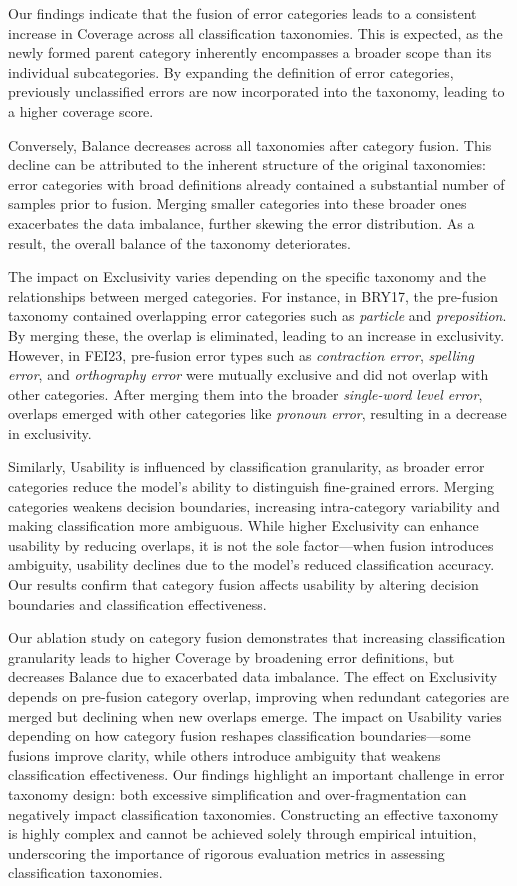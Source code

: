 
Our findings indicate that the fusion of error categories leads to a consistent increase in Coverage across all classification taxonomies. This is expected, as the newly formed parent category inherently encompasses a broader scope than its individual subcategories. By expanding the definition of error categories, previously unclassified errors are now incorporated into the taxonomy, leading to a higher coverage score.

Conversely, Balance decreases across all taxonomies after category fusion. This decline can be attributed to the inherent structure of the original taxonomies: error categories with broad definitions already contained a substantial number of samples prior to fusion. Merging smaller categories into these broader ones exacerbates the data imbalance, further skewing the error distribution. As a result, the overall balance of the taxonomy deteriorates.

The impact on Exclusivity varies depending on the specific taxonomy and the relationships between merged categories. For instance, in BRY17, the pre-fusion taxonomy contained overlapping error categories such as \textit{particle} and \textit{preposition}. By merging these, the overlap is eliminated, leading to an increase in exclusivity. However, in FEI23, pre-fusion error types such as \textit{contraction error}, \textit{spelling error}, and \textit{orthography error} were mutually exclusive and did not overlap with other categories. After merging them into the broader \textit{single-word level error}, overlaps emerged with other categories like \textit{pronoun error}, resulting in a decrease in exclusivity.

Similarly, Usability is influenced by classification granularity, as broader error categories reduce the model's ability to distinguish fine-grained errors. Merging categories weakens decision boundaries, increasing intra-category variability and making classification more ambiguous. While higher Exclusivity can enhance usability by reducing overlaps, it is not the sole factor—when fusion introduces ambiguity, usability declines due to the model's reduced classification accuracy. Our results confirm that category fusion affects usability by altering decision boundaries and classification effectiveness.

Our ablation study on category fusion demonstrates that increasing classification granularity leads to higher Coverage by broadening error definitions, but decreases Balance due to exacerbated data imbalance. The effect on Exclusivity depends on pre-fusion category overlap, improving when redundant categories are merged but declining when new overlaps emerge. The impact on Usability varies depending on how category fusion reshapes classification boundaries—some fusions improve clarity, while others introduce ambiguity that weakens classification effectiveness. Our findings highlight an important challenge in error taxonomy design: both excessive simplification and over-fragmentation can negatively impact classification taxonomies. Constructing an effective taxonomy is highly complex and cannot be achieved solely through empirical intuition, underscoring the importance of rigorous evaluation metrics in assessing classification taxonomies.

